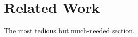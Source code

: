 \documentclass[a4paper,notoc,oneside]{tufte-book}
\begin{document}
\chapter{Related Work}

The most tedious but much-needed section.
\end{document}
